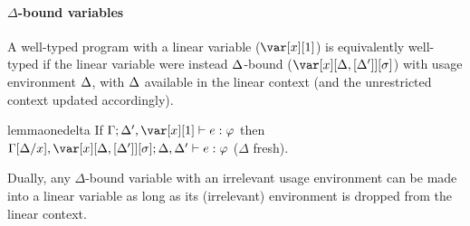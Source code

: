 \documentclass[acmsmall,review,screen]{acmart}
\begin{document}
\renewcommand{\DeltaLinearRelationLemma}{
\begin{restatable}[$\Delta$-bound to Linear]{lemma}{deltaone}\label{lem:deltaone}
If $\G,\x[\irr{\D}]; \irr{\D},\D' \vdash e : \vp$ 
then $\G[x/\irr{\D}]; \D',\xl \vdash e :\vp$.
\end{restatable}
}

\renewcommand{\LinearDeltaRelationLemma}{
  \begin{restatable}[Linear to $\Delta$-bound]{lemma}{onedelta}\label{lem:onedelta}
If $\G; \D',\xl \vdash e :\vp$
then $\G[\D/x],\xD; \D,\D' \vdash e : \vp$ ($\Delta$ fresh).
\end{restatable}
}

\renewcommand{\DeltaUnrestrictedRelationLemma}{
\begin{restatable}[Unrestricted and $\Delta$-bound]{lemma}{undelta}\label{lem:undelta}
$\G,\xo; \D \vdash e : \vp$ iff $\G,\x[\cdot]; \D \vdash e : \vp$
\end{restatable}
}

\paragraph{$\Delta$-bound variables} %
A well-typed program with a linear variable ($\xl$) is equivalently
well-typed if the linear variable were instead $\Delta$-bound ($\xD$) with
usage environment $\Delta$, with $\Delta$ available in the linear context (and the unrestricted context updated accordingly).

\LinearDeltaRelationLemma


\noindent Dually, any $\Delta$-bound variable with an irrelevant usage
environment can be made into a linear variable as long as its
(irrelevant) environment is dropped from the linear context.

\end{document}

